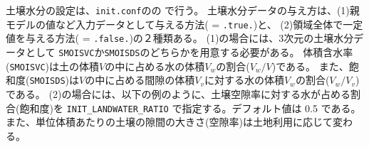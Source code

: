 土壌水分の設定は、\verb|init.conf|のの
で行う。
土壌水分データの与え方は、(1)親モデルの値など入力データとして与える方法( = \verb|.true.|)と、
(2)領域全体で一定値を与える方法( = \verb|.false.|)の２種類ある。
(1)の場合には、3次元の土壌水分データとして
\verb|SMOISVC|か\verb|SMOISDS|のどちらかを用意する必要がある。
体積含水率(\verb|SMOISVC|)は土の体積$V$の中に占める水の体積$V_w$の割合($V_w / V$)である。
また、飽和度(\verb|SMOISDS|)は$V$の中に占める間隙の体積$V_v$に対する水の体積$V_w$の割合($V_w / V_v$)である。
%
(2)の場合には、以下の例のように、土壌空隙率に対する水が占める割合(飽和度)を
\verb|INIT_LANDWATER_RATIO| で指定する。デフォルト値は 0.5 である。
また、単位体積あたりの土壌の隙間の大きさ(空隙率)は土地利用に応じて変わる。



